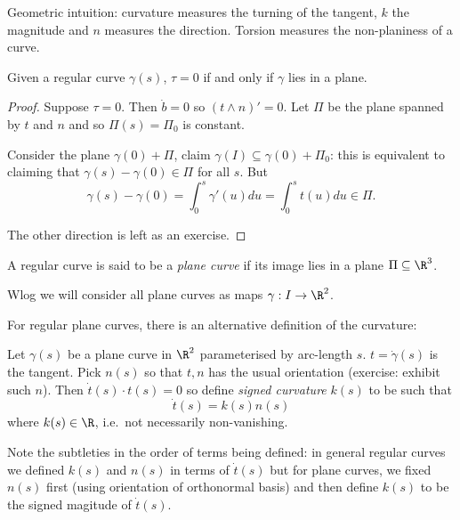 \documentclass[a4paper]{article}
\begin{document}
Geometric intuition: curvature measures the turning of the tangent, \(k\) the magnitude and \(n\) measures the direction. Torsion measures the non-planiness of a curve.

\begin{proposition}
  Given a regular curve \(\gamma(s)\), \(\tau = 0\) if and only if \(\gamma\) lies in a plane.
\end{proposition}

\begin{proof}
  Suppose \(\tau = 0\). Then \(\dot b = 0\) so \((t \wedge n)' = 0\). Let \(\Pi\) be the plane spanned by \(t\) and \(n\) and so \(\Pi(s) = \Pi_0\) is constant.

  Consider the plane \(\gamma(0) + \Pi\), claim \(\gamma(I) \subseteq \gamma(0) + \Pi_0\): this is equivalent to claiming that \(\gamma(s) - \gamma(0) \in \Pi\) for all \(s\). But
  \[
    \gamma(s) - \gamma(0) = \int_0^s \gamma'(u)du = \int_0^s t(u)du \in \Pi.
  \]

  The other direction is left as an exercise.
\end{proof}

\begin{definition}
  A regular curve is said to be a \emph{plane curve} if its image lies in a plane \(\Pi \subseteq \R^3\).
\end{definition}

Wlog we will consider all plane curves as maps \(\gamma: I \to \R^2\).

For regular plane curves, there is an alternative definition of the curvature:

\begin{definition}
  Let \(\gamma(s)\) be a plane curve in \(\R^2\) parameterised by arc-length \(s\). \(t = \dot \gamma(s)\) is the tangent. Pick \(n(s)\) so that \(t, n\) has the usual orientation (exercise: exhibit such \(n\)). Then \(\dot t(s) \cdot t(s) = 0\) so define \emph{signed curvature} \(k(s)\) to be such that
  \[
    \dot t(s) = k(s)n(s)
  \]
  where \(k(s) \in \R\), i.e.\ not necessarily non-vanishing.
\end{definition}

Note the subtleties in the order of terms being defined: in general regular curves we defined \(k(s)\) and \(n(s)\) in terms of \(\dot t(s)\) but for plane curves, we fixed \(n(s)\) first (using orientation of orthonormal basis) and then define \(k(s)\) to be the signed magitude of \(\dot t(s)\).
\end{document}

